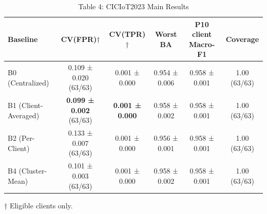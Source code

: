 \begin{table}[htbp]
\caption{Table 4: CICIoT2023 Main Results}
\centering
\begin{tabular}{l c c c c c}
\toprule
Baseline & CV(FPR)$\dagger$ & CV(TPR)$\dagger$ & Worst BA & P10 client Macro-F1 & Coverage \\
\midrule
B0 (Centralized) & 0.109 ± 0.020 (63/63) & 0.001 ± 0.000 & 0.954 ± 0.006 & 0.958 ± 0.001 & 1.00 (63/63) \\
B1 (Client-Averaged) & \textbf{0.099 ± 0.002} (63/63) & \textbf{0.001 ± 0.000} & 0.958 ± 0.002 & 0.958 ± 0.001 & 1.00 (63/63) \\
B2 (Per-Client) & 0.133 ± 0.007 (63/63) & 0.001 ± 0.000 & 0.956 ± 0.001 & 0.958 ± 0.001 & 1.00 (63/63) \\
B4 (Cluster-Mean) & 0.101 ± 0.003 (63/63) & 0.001 ± 0.000 & 0.958 ± 0.002 & 0.958 ± 0.001 & 1.00 (63/63) \\
\bottomrule
\end{tabular}

\footnotesize{† Eligible clients only.}

\end{table}